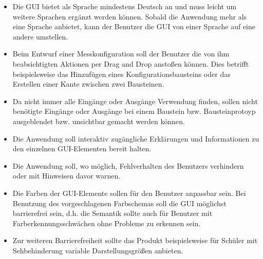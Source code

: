 \documentclass[parskip=full]{scrartcl}
\begin{document}
\begin{itemize}
	
	\item 
	\begin{WunschKrit} 		
		Die \gls{GUI} bietet als Sprache mindestens Deutsch an und muss leicht um weitere Sprachen ergänzt werden können. Sobald die Anwendung mehr als eine Sprache anbietet, kann der Benutzer die GUI von einer Sprache auf eine andere umstellen.	
	\end{WunschKrit}
	\item 
	\begin{SollKrit} 
		Beim Entwurf einer Messkonfiguration soll der Benutzer die von ihm beabsichtigten Aktionen per Drag and Drop anstoßen können. Dies betrifft beispielsweise das Hinzufügen eines Konfigurationsbausteins oder das Erstellen einer Kante zwischen zwei Bausteinen.
	\end{SollKrit}
	\item 
	\begin{WunschKrit}
		Da nicht immer alle Eingänge oder Ausgänge Verwendung finden, sollen nicht benötigte Eingänge oder Ausgänge bei einem Baustein bzw. Bausteinprotoyp ausgeblendet bzw. unsichtbar gemacht werden können. 
	\end{WunschKrit}
	\item 
	\begin{SollKrit}
		Die Anwendung soll interaktiv zugängliche Erklärungen und Informationen zu den einzelnen GUI-Elementen bereit halten.
	\end{SollKrit}
	\item
	\begin{SollKrit}
		Die Anwendung soll, wo möglich, Fehlverhalten des Benutzers verhindern oder mit Hinweisen davor warnen. 
	\end{SollKrit}
	\item 
	\begin{WunschKrit} 
		Die Farben der GUI-Elemente sollen für den Benutzer anpassbar sein. Bei Benutzung des vorgeschlagenen Farbschemas soll die \gls{GUI} möglichst barrierefrei sein, d.h. die Semantik sollte auch für Benutzer mit Farberkennungsschwächen ohne Probleme zu erkennen sein.
	\end{WunschKrit} 
	
	\item 
	\begin{WunschKrit} 
		Zur weiteren Barrierefreiheit sollte das Produkt beispielsweise für Schüler mit Sehbehinderung variable Darstellungsgrößen anbieten.
	\end{WunschKrit}
	
	
\end{itemize}
\end{document}
